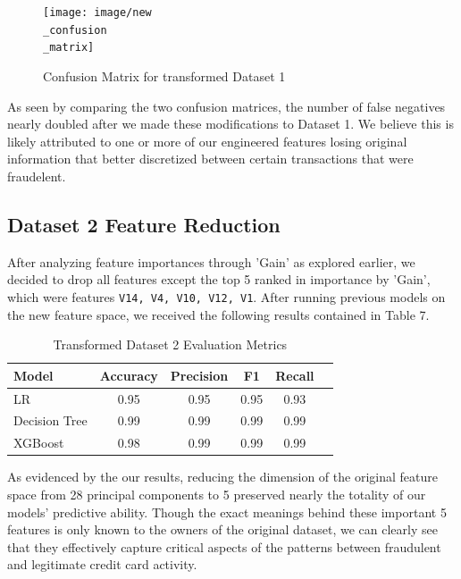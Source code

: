 \documentclass{article}
\begin{document}
\begin{figure}[h]
\centering
\texttt{[image: image/new\\\_confusion\\\_matrix]} %
\caption{Confusion Matrix for transformed Dataset 1}
\label{fig:my_photo} %
\end{figure}


As seen by comparing the two confusion matrices, the number of false negatives nearly doubled after we made these modifications to Dataset 1. We believe this is likely attributed to one or more of our engineered features losing original information that better discretized between certain transactions that were fraudelent. 

\subsection{Dataset 2 Feature Reduction}

After analyzing feature importances through 'Gain' as explored earlier, we decided to drop all features except the top 5 ranked in importance by 'Gain', which were features \texttt{V14, V4, V10, V12, V1}. After running previous models on the new feature space, we received the following results contained in Table 7. 

\begin{table}[ht]
\centering

\label{tab:card_trans_metrics}
\begin{tabular}{lccccc}
\toprule
Model & Accuracy & Precision & F1 & Recall\\
\midrule
LR & 0.95 & 0.95 & 0.95 & 0.93\\
Decision Tree & 0.99 & 0.99 & 0.99 & 0.99\\
XGBoost & 0.98& 0.99& 0.99& 0.99\\
\bottomrule
\end{tabular}
\caption{Transformed Dataset 2 Evaluation Metrics}
\end{table}

As evidenced by the our results, reducing the dimension of the original feature space from 28 principal components to 5 preserved nearly the totality of our models' predictive ability. Though the exact meanings behind these important 5 features is only known to the owners of the original dataset, we can clearly see that they effectively capture critical aspects of the patterns between fraudulent and legitimate credit card activity.
\end{document}
